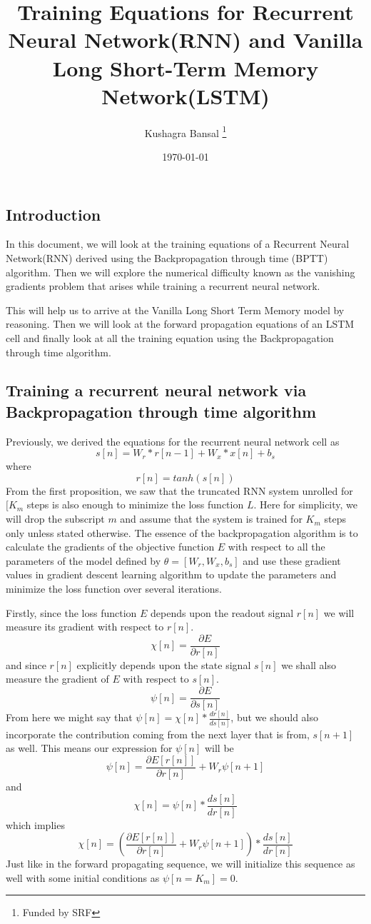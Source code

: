 \documentclass[12pt,letterpaper]{article}
\title{Training Equations for Recurrent Neural Network(RNN) and Vanilla Long Short-Term Memory Network(LSTM)}
\author{Kushagra Bansal \thanks {Funded by SRF}}
\date{\today}
\begin{document}
\maketitle
\subsection{Introduction}
In this document, we will look at the training equations of a Recurrent Neural Network(RNN) derived using the Backpropagation through time (BPTT) algorithm. Then we will explore the numerical difficulty known as the vanishing gradients problem that arises while training a recurrent neural network. 

This will help us to arrive at the Vanilla Long Short Term Memory model by reasoning. Then we will look at the forward propagation equations of an LSTM cell and finally look at all the training equation using the Backpropagation through time algorithm.
\subsection{Training a recurrent neural network via Backpropagation through time algorithm}
Previously, we derived the equations for the recurrent neural network cell as
\[
s[n] = W_{r}*r[n-1]+W_{x}*x[n]+b_{s}    \tag{1}
\]
where
\[
r[n] = tanh(s[n])                              \tag{2}  
\]
From the first proposition, we saw that the truncated RNN system unrolled for $[K_{m}$ steps is also enough to minimize the loss function $L$.
Here for simplicity, we will drop the subscript $m$ and assume that the system is trained for $K_{m}$ steps only unless stated otherwise.
The essence of the backpropagation algorithm is to calculate the gradients of the objective function $E$ with respect to all the parameters of the model defined by $\theta = [W_{r}, W_{x},b_{s}]$ and use these gradient values in gradient descent learning algorithm to update the parameters and minimize the loss function over several iterations.

Firstly, since the loss function $E$ depends upon the readout signal $r[n]$ we will measure its gradient with respect to $r[n]$.
\[
\chi[n] = \frac{\partial{E}}{\partial{r[n]}}  \tag{3}
\]
and since $r[n]$ explicitly depends upon the state signal $s[n]$ we shall also measure the gradient of $E$ with respect to $s[n]$.
\[
\psi[n] = \frac{\partial{E}}{\partial{s[n]}}    \tag{4}
\]
From here we might say that $\psi[n] = \chi[n]*\frac{d r[n]}{d s[n]}$, but we should also incorporate the contribution coming from the next layer that is from, $s[n+1]$ as well.
This means our expression for $\psi[n]$ will be
\[
\psi[n] = \frac{\partial{E[r[n]]}}{\partial{r[n]}}+ W_{r}\psi[n+1]   \tag{5}
\]
and
\[
\chi[n] = \psi[n]*\frac{ds[n]}{dr[n]} \tag{6}
\]
which implies 
\[
\chi[n] = \left(\frac{\partial{E[r[n]]}}{\partial{r[n]}}+ W_{r}\psi[n+1]\right)*\frac{ds[n]}{dr[n]}\tag{7}
\]
Just like in the forward propagating sequence, we will initialize this sequence as well with some initial conditions as $\psi[n=K_{m}] = 0$.
\end{document}
